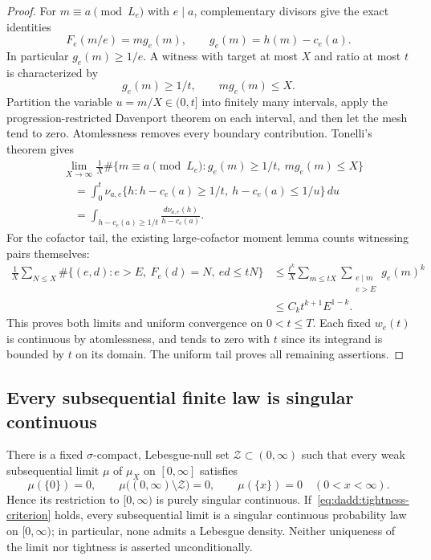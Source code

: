 \begin{proof}
For $m\equiv a\pmod{L_e}$ with $e\mid a$, complementary divisors
give the exact identities
\[
 F_e(m/e)=m g_e(m),
 \qquad
 g_e(m)=h(m)-c_e(a).
\]
In particular $g_e(m)\geq1/e$. A witness with target at most $X$
and ratio at most $t$ is characterized by
\[
 g_e(m)\geq1/t,
 \qquad m g_e(m)\leq X.
\]
Partition the variable $u=m/X\in(0,t]$ into finitely many
intervals, apply the progression-restricted Davenport theorem on
each interval, and then let the mesh tend to zero. Atomlessness
removes every boundary contribution. Tonelli's theorem gives
\begin{align*}
 &\lim_{X\to\infty}\frac1X
   \#\{m\equiv a\pmod{L_e}:
       g_e(m)\geq1/t,\ m g_e(m)\leq X\}\\
 &\quad=
 \int_0^t\nu_{a,e}
       \{h:h-c_e(a)\geq1/t,\ h-c_e(a)\leq1/u\}\,du\\
 &\quad=
 \int_{h-c_e(a)\geq1/t}
       \frac{d\nu_{a,e}(h)}{h-c_e(a)}.
\end{align*}
For the cofactor tail, the existing large-cofactor moment lemma
counts witnessing pairs themselves:
\begin{align}
 \frac1X\sum_{N\leq X}
  \#\{(e,d):e>E,\ F_e(d)=N,\ ed\leq tN\}
 &\leq\frac{t^k}{X}
   \sum_{m\leq tX}\sum_{\substack{e\mid m\\e>E}}g_e(m)^k
 \nonumber\\
 &\leq C_kt^{k+1}E^{1-k}.
 \label{eq:dadd:witness-tail}
\end{align}
This proves both limits and uniform convergence on $0<t\leq T$.
Each fixed $w_e(t)$ is continuous by atomlessness, and tends to
zero with $t$ since its integrand is bounded by $t$ on its domain.
The uniform tail proves all remaining assertions.
\end{proof}

\subsection{Every subsequential finite law is singular continuous}

\begin{theorem}
\label{thm:dadd:universal-singularity}
There is a fixed $\sigma$-compact, Lebesgue-null set
$\mathcal Z\subset(0,\infty)$ such that every weak subsequential
limit $\mu$ of $\mu_X$ on $[0,\infty]$ satisfies
\[
 \mu(\{0\})=0,
 \qquad
 \mu\bigl((0,\infty)\setminus\mathcal Z\bigr)=0,
 \qquad
 \mu(\{x\})=0\quad(0<x<\infty).
\]
Hence its restriction to $[0,\infty)$ is purely singular
continuous. If~\eqref{eq:dadd:tightness-criterion} holds, every
subsequential limit is a singular continuous probability law on
$[0,\infty)$; in particular, none admits a Lebesgue density.
Neither uniqueness of the limit nor tightness is asserted
unconditionally.
\end{theorem}

